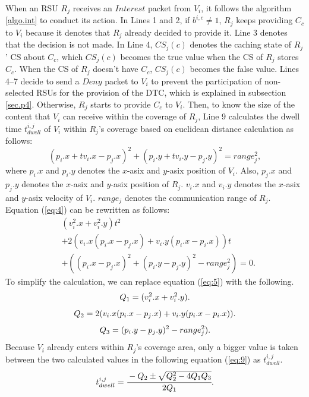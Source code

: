 \documentclass{ieeeaccess}
\begin{document}
When an RSU $R_{j}$ receives an $Interest$ packet from $V_{i}$, it follows the algorithm \ref{algo.int} to conduct its action.
In Lines 1 and 2, if $b^{i,c} \neq 1$, $R_{j}$ keeps providing $C_{c}$ to $V_{i}$ because it denotes that $R_{j}$ already decided to provide it.
Line 3 denotes that the decision is not made.
In Line 4, $CS_{j}(c)$ denotes the caching state of $R_{j}$' CS about $C_{c}$, which $CS_{j}(c)$ becomes the true value when the CS of $R_{j}$ stores $C_{c}$.
When the CS of $R_{j}$ doesn't have $C_{c}$, $CS_{j}(c)$ becomes the false value.
Lines 4--7 decide to send a $Deny$ packet to $V_{i}$ to prevent the participation of non-selected RSUs for the provision of the DTC, which is explained in subsection \ref{sec.p4}.
Otherwise, $R_{j}$ starts to provide $C_{c}$ to $V_{i}$.
Then, to know the size of the content that  $V_{i}$ can receive within the coverage of $R_{j}$, Line 9 calculates the dwell time $t^{i,j}_{dwell}$ of $V_{i}$ within $R_{j}$'s coverage based on euclidean distance calculation as follows:
\begin{equation}
    (p_{i}.x + tv_{i}.x - p_{j}.x)^{2}+(p_{i}.y + tv_{i}.y - p_{j}.y)^{2} = range^{2}_{j}, \label{eq:4}
\end{equation}
where $p_{i}.x$ and $p_{i}.y$ denotes the $x$-asix and $y$-asix position of $V_{i}$.
Also, $p_{j}.x$ and $p_{j}.y$ denotes the $x$-asix and $y$-asix position of $R_{j}$.
$v_{i}.x$ and $v_{i}.y$ denotes the $x$-asix and $y$-asix velocity of $V_{i}$.
$range_{j}$ denotes the communication range of $R_{j}$. 
Equation (\ref{eq:4}) can be rewritten as follows:\\
\begin{equation} \begin{split}
    & (v_{i}^{2}.x+v_{i}^{2}.y)t^{2}\\
    & + 2(v_{i}.x(p_{i}.x-p_{j}.x)+v_{i}.y(p_{i}.x-p_{i}.x))t \\
    & + ((p_{i}.x-p_{j}.x)^{2}+(p_{i}.y-p_{j}.y)^{2}-range^{2}_{j}) = 0. \label{eq:5}
\end{split} \end{equation}
To simplify the calculation, we can replace equation (\ref{eq:5}) with the following.\\
\begin{equation}
    Q_{1} = (v_{i}^{2}.x+v_{i}^{2}.y). \\
\end{equation}    
\begin{equation}
    Q_{2} = 2(v_{i}.x(p_{i}.x-p_{j}.x)+v_{i}.y(p_{i}.x-p_{i}.x)). \\
\end{equation}    
\begin{equation}
    Q_{3} = (p_{i}.y-p_{j}.y)^{2}-range^{2}_{j}). \\
\end{equation}
Because $V_{i}$ already enters within $R_{j}$'s coverage area, only a bigger value is taken between the two calculated values in the following equation (\ref{eq:9}) as $t^{i,j}_{dwell}$.
\begin{equation}
    t^{i,j}_{dwell} = \cfrac{-Q_{2}\pm\sqrt{Q_{2}^{2}-4Q_{1}Q_{3}}}{2Q_{1}}. \label{eq:9}
\end{equation}
\end{document}
